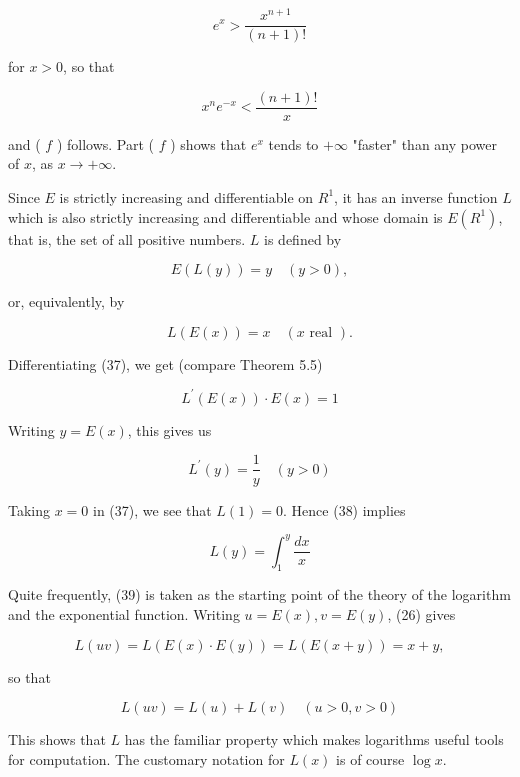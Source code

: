 \documentclass[10pt]{article}
\begin{document}
$$
e^{x}>\frac{x^{n+1}}{(n+1)!}
$$

for $x>0$, so that

$$
x^{n} e^{-x}<\frac{(n+1)!}{x}
$$

and ( $f$ ) follows. Part ( $f$ ) shows that $e^{x}$ tends to $+\infty$ "faster" than any power of $x$, as $x \rightarrow+\infty$.

Since $E$ is strictly increasing and differentiable on $R^{1}$, it has an inverse function $L$ which is also strictly increasing and differentiable and whose domain is $E\left(R^{1}\right)$, that is, the set of all positive numbers. $L$ is defined by


\begin{equation*}
E(L(y))=y \quad(y>0), \tag{36}
\end{equation*}


or, equivalently, by


\begin{equation*}
L(E(x))=x \quad(x \text { real }) . \tag{37}
\end{equation*}


Differentiating (37), we get (compare Theorem 5.5)

$$
L^{\prime}(E(x)) \cdot E(x)=1
$$

Writing $y=E(x)$, this gives us


\begin{equation*}
L^{\prime}(y)=\frac{1}{y} \quad(y>0) \tag{38}
\end{equation*}


Taking $x=0$ in (37), we see that $L(1)=0$. Hence (38) implies


\begin{equation*}
L(y)=\int_{1}^{y} \frac{d x}{x} \tag{39}
\end{equation*}


Quite frequently, (39) is taken as the starting point of the theory of the logarithm and the exponential function. Writing $u=E(x), v=E(y)$, (26) gives

$$
L(u v)=L(E(x) \cdot E(y))=L(E(x+y))=x+y,
$$

so that


\begin{equation*}
L(u v)=L(u)+L(v) \quad(u>0, v>0) \tag{40}
\end{equation*}


This shows that $L$ has the familiar property which makes logarithms useful tools for computation. The customary notation for $L(x)$ is of course $\log x$.
\end{document}
